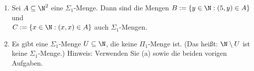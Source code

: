 
\begin{exercise}[236]

\phantom{}
	\begin{enumerate}[label = (\alph*)]
		\item Sei $A \subseteq \N^2$ eine $\Sigma_1$-Menge. Dann sind die Mengen
		$B := \{y \in \N: (5,y) \in A\}$ und \\
		$C := \{x \in \N: (x,x) \in A\}$ auch $\Sigma_1$-Mengen.

		\item Es gibt eine $\Sigma_1$-Menge $U \subseteq \N$, die keine $\Pi_1$-Menge ist. (Das heißt: $\N \setminus U$ ist keine $\Sigma_1$-Menge.)    Hinweis: Verwenden Sie (a) sowie die beiden vorigen Aufgaben.
	\end{enumerate}

\end{exercise}


